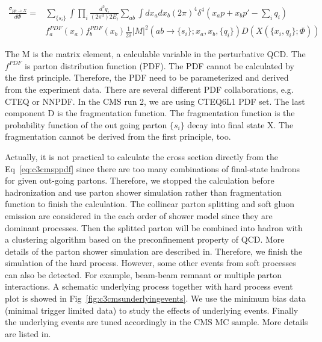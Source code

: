 \begin{equation}
  \begin{split}
		\frac{\sigma_{pp \rightarrow X}}{d\Phi}=& \sum_{\{s_{i}\}} \int \prod_{i} \frac{d^{3}q_{i}}{(2\pi^{3})2E_{i}} \sum_{ab} \int dx_{a}dx_{b}(2\pi)^{4}\delta^{4}(x_{a}p+x_{b}p\prime-\sum_{i}q_{i}) \\
	                                          & f_{a}^{PDF}(x_{a})f_{b}^{PDF}(x_{b}) \frac{1}{2\hat{s}}|M|^{2}(ab \rightarrow \{s_{i}\};x_{a},x_{b},\{q_{i}\}) D(X(\{x_{i},q_{i}\};\Phi))
  \end{split}
 \label{eq:c3cmsppdf}
\end{equation}

The M is the matrix element, a calculable variable in the perturbative QCD. The $f^{PDF}$ is parton distribution function (PDF)\cite{Butterworth:2015oua}. The PDF cannot be calculated by the first principle. Therefore, the PDF need to be parameterized and derived from the experiment data. There are several different PDF collaborations, e.g. CTEQ or NNPDF. In the CMS run 2, we are using CTEQ6L1 PDF set. The last component D is the fragmentation function. The fragmentation function is the probability function of the out going parton $\{s_{i}\}$ decay into final state X. The fragmentation cannot be derived from the first principle, too. 

Actually, it is not practical to calculate the cross section directly from the Eq~\ref{eq:c3cmsppdf} since there are too many combinations of final-state hadrons for given out-going partons. Therefore, we stopped the calculation before hadronization and use parton shower simulation rather than fragmentation function to finish the calculation. The collinear parton splitting and soft gluon emission are considered in the each order of shower model since they are dominant processes. Then the splitted parton will be combined into hadron with a clustering algorithm based on the preconfinement property of QCD\cite{Amati:1979fg}. More details of the parton shower simulation are described in\cite{Hoche:2014rga}. 
Therefore, we finish the simulation of the hard process. However, some other events from soft processes can also be detected. For example, beam-beam remnant or multiple parton interactions. A schematic underlying process together with hard process event plot is showed in Fig~\ref{fig:c3cmsunderlyingevents}. We use the minimum bias data (minimal trigger limited data) to study the effects of underlying events. Finally the underlying events are tuned accordingly in the CMS MC sample. More details are listed in\cite{Field:1393621}. 

